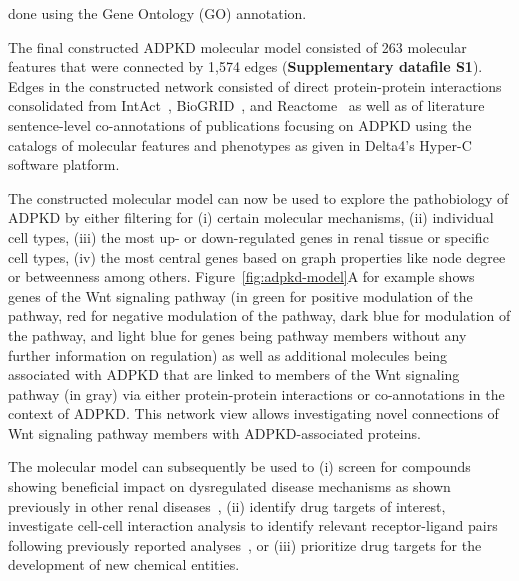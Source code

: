done using the Gene Ontology (GO) annotation.

The final constructed ADPKD molecular model consisted of 263 molecular features that were connected by 1,574 edges (\textbf{Supplementary datafile S1}). Edges in the constructed network consisted of direct protein-protein interactions consolidated from IntAct~\citep{orchardMIntActProjectIntAct2014}, BioGRID~\citep{oughtredBioGRIDDatabaseComprehensive2021}, and Reactome~\citep{milacicReactomePathwayKnowledgebase2024} as well as of literature sentence-level co-annotations of publications focusing on ADPKD using the catalogs of molecular features and phenotypes as given in Delta4's Hyper-C software platform.

The constructed molecular model can now be used to explore the pathobiology of ADPKD by either filtering for (i) certain molecular mechanisms, (ii) individual cell types, (iii) the most up- or down-regulated genes in renal tissue or specific cell types, (iv) the most central genes based on graph properties like node degree or betweenness among others. Figure~\ref{fig:adpkd-model}A for example shows genes of the Wnt signaling pathway (in green for positive modulation of the pathway, red for negative modulation of the pathway, dark blue for modulation of the pathway, and light blue for genes being pathway members without any further information on regulation) as well as additional molecules being associated with ADPKD that are linked to members of the Wnt signaling pathway (in gray) via either protein-protein interactions or co-annotations in the context of ADPKD. This network view allows investigating novel connections of Wnt signaling pathway members with ADPKD-associated proteins.

The molecular model can subsequently be used to (i) screen for compounds showing beneficial impact on dysregulated disease mechanisms as shown previously in other renal diseases~\citep{gebeshuberComputationalDrugRepositioning2023}, (ii) identify drug targets of interest, investigate cell-cell interaction analysis to identify relevant receptor-ligand pairs following previously reported analyses~\citep{evgeniouMetaAnalysisHumanTranscriptomics2021}, or (iii) prioritize drug targets for the development of new chemical entities.

